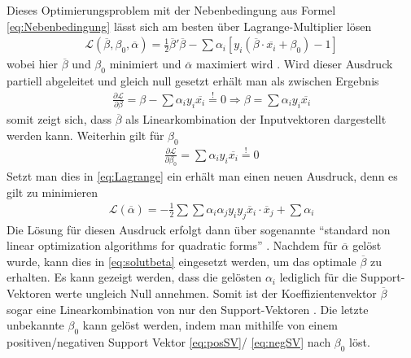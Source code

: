 \documentclass[
]{article}
\begin{document}
Dieses Optimierungsproblem mit der Nebenbedingung aus Formel
\eqref{eq:Nebenbedingung} lässt sich am besten über Lagrange-Multiplier
lösen \begin{align}
\mathcal{L}(\overline\beta,\beta_0,\overline \alpha)=\frac{1}{2}\overline \beta ' \overline \beta-\sum \alpha_i[y_i(\overline \beta \cdot \overline{x_i}+\beta_0)-1]\label{eq:Lagrange}
\end{align} wobei hier \(\overline{\beta}\) und \(\beta_0\) minimiert
und \(\overline{\alpha}\) maximiert wird
\parencite{vapnikEstimationDependencesBased2006}. Wird dieser Ausdruck
partiell abgeleitet und gleich null gesetzt erhält man als zwischen
Ergebnis \begin{align}
\frac{\partial \mathcal{L}}{\partial \beta}=\beta-\sum \alpha_i y_i \overline{x_i}\overset{!}{=}0 \Rightarrow \beta=\sum \alpha_i y_i \overline{x_i}\label{eq:solutbeta}
\end{align} somit zeigt sich, dass \(\overline{\beta}\) als
Linearkombination der Inputvektoren dargestellt werden kann. Weiterhin
gilt für \(\beta_0\) \begin{align}
\frac{\partial \mathcal{L}}{\partial \beta_0}=\sum \alpha_i y_i \overline{x_i}\overset{!}{=}0\label{eq:solutbeta0}
\end{align} Setzt man dies in \eqref{eq:Lagrange} ein erhält man einen
neuen Ausdruck, denn es gilt zu minimieren \begin{align}
\mathcal{L}(\overline \alpha)=-\frac{1}{2}\sum \sum \alpha_i \alpha_j y_i y_j \overline{x}_i \cdot \overline{x}_j+\sum \alpha_i\label{eq:dualproblem}
\end{align} Die Lösung für diesen Ausdruck erfolgt dann über sogenannte
\enquote{standard non linear optimization algorithms for quadratic forms}
\parencite{boserTrainingAlgorithmOptimal1992}. Nachdem für
\(\overline \alpha\) gelöst wurde, kann dies in \eqref{eq:solutbeta}
eingesetzt werden, um das optimale \(\overline{\beta}\) zu erhalten. Es
kann gezeigt werden, dass die gelösten \(\alpha_i\) lediglich für die
Support-Vektoren werte ungleich Null annehmen. Somit ist der
Koeffizientenvektor \(\overline{\beta}\) sogar eine Linearkombination
von nur den Support-Vektoren
\parencite{boserTrainingAlgorithmOptimal1992}. Die letzte unbekannte
\(\beta_0\) kann gelöst werden, indem man mithilfe von einem
positiven/negativen Support Vektor \eqref{eq:posSV}/ \eqref{eq:negSV}
nach \(\beta_0\) löst.
\end{document}
